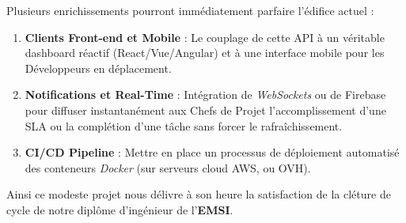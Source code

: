 Plusieurs enrichissements pourront imm\'{e}diatement parfaire l'\'{e}difice actuel :
\begin{enumerate}[leftmargin=*]
    \item \textbf{Clients Front-end et Mobile} : Le couplage de cette API \`{a} un v\'{e}ritable
    dashboard r\'{e}actif (React/Vue/Angular) et \`{a} une interface mobile pour les D\'{e}veloppeurs en d\'{e}placement.
    \item \textbf{Notifications et Real-Time} : Int\'{e}gration de \textit{WebSockets} ou de Firebase
    pour diffuser instantan\'{e}ment aux Chefs de Projet l'accomplissement d'une SLA ou la compl\'{e}tion d'une t\^{a}che sans forcer le rafraîchissement.
    \item \textbf{CI/CD Pipeline} : Mettre en place un processus de d\'{e}ploiement automatis\'{e}
    des conteneurs \textit{Docker} (sur serveurs cloud AWS, ou OVH).
\end{enumerate}

Ainsi ce modeste projet nous d\'{e}livre \`{a} son heure la satisfaction de la cl\'{e}ture
de cycle de notre dipl\^{o}me d'ing\'{e}nieur de l'\textbf{EMSI}.

